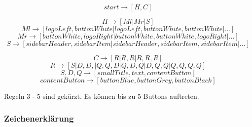 \documentclass[pdftex,a4paper,halfparskip, article]{scrartcl}
\begin{document}
\begin{equation}
start \rightarrow [H,C]
\end{equation}

\begin{equation}
H \rightarrow [Ml | Mr | S]
\end{equation}
\begin{equation}
Ml \rightarrow  [ logoLeft, buttonWhite | logoLeft, buttonWhite, buttonWhite | ...]
\end{equation}
\begin{equation}
Mr \rightarrow [buttonWhite, logoRight | buttonWhite, buttonWhite, logoRight | ...]
\end{equation}
\begin{equation}
S \rightarrow [sidebarHeader, sidebarItem| sidebarHeader, sidebarItem, sidebarItem | ...]
\end{equation}

\begin{equation}
C \rightarrow [R | R, R | R, R, R ]
\end{equation}
\begin{equation}
R \rightarrow [S | D, D, | Q, Q, D | Q, D, Q | D, Q, Q | Q, Q, Q, Q]
\end{equation}
\begin{equation}
S, D, Q \rightarrow [smallTitle, text, contentButton]
\end{equation}
\begin{equation}
contentButton \rightarrow [buttonBlue, buttonGrey, buttonBlack]
\end{equation}

Regeln 3 - 5 sind gekürzt. Es können bis zu 5 Buttons auftreten.

\subsubsection{Zeichenerklärung}
\end{document}
